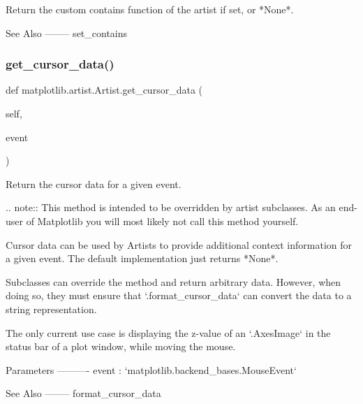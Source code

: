 \begin{DoxyVerb}Return the custom contains function of the artist if set, or *None*.

See Also
--------
set_contains
\end{DoxyVerb}
 \mbox{\label{classmatplotlib_1_1artist_1_1Artist_a7db4cccb954fd76ecffab8ea7eab1b24}} 
\subsubsection{\texorpdfstring{get\+\_\+cursor\+\_\+data()}{get\_cursor\_data()}}
{\footnotesize\ttfamily def matplotlib.\+artist.\+Artist.\+get\+\_\+cursor\+\_\+data (\begin{DoxyParamCaption}\item[{}]{self,  }\item[{}]{event }\end{DoxyParamCaption})}

\begin{DoxyVerb}Return the cursor data for a given event.

.. note::
    This method is intended to be overridden by artist subclasses.
    As an end-user of Matplotlib you will most likely not call this
    method yourself.

Cursor data can be used by Artists to provide additional context
information for a given event. The default implementation just returns
*None*.

Subclasses can override the method and return arbitrary data. However,
when doing so, they must ensure that `.format_cursor_data` can convert
the data to a string representation.

The only current use case is displaying the z-value of an `.AxesImage`
in the status bar of a plot window, while moving the mouse.

Parameters
----------
event : `matplotlib.backend_bases.MouseEvent`

See Also
--------
format_cursor_data\end{DoxyVerb}
 \mbox{\label{classmatplotlib_1_1artist_1_1Artist_abf1a21bbcccb778954e19d689ee35cc2}} 

